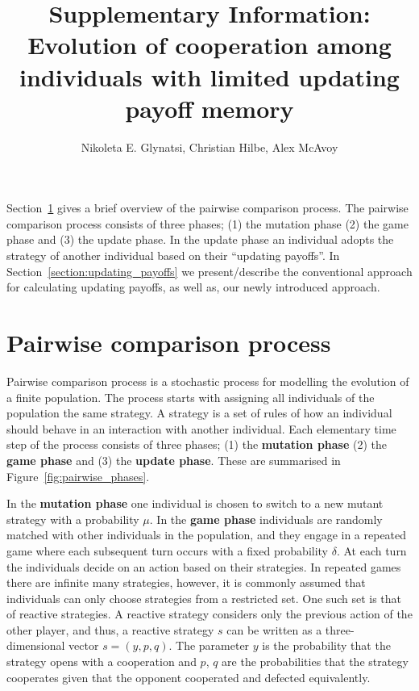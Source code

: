 \documentclass[11pt]{article}
\title{\bf  \sffamily \LARGE Supplementary Information: Evolution of cooperation among individuals with
limited updating payoff memory\\}
\date{}
\author{Nikoleta E. Glynatsi, Christian Hilbe, Alex McAvoy}
\theoremstyle{plainCl1}
\theoremstyle{plainCl2}
\begin{document}
\maketitle

Section~\ref{section:pairwise_comparison} gives a brief overview of the pairwise
comparison process. The pairwise comparison process consists of three phases;
(1) the mutation phase (2) the game phase and (3) the update phase. In the update
phase an individual adopts the strategy of another individual based on their
``updating payoffs''. In Section~\ref{section:updating_payoffs} we
present/describe the conventional approach for calculating updating payoffs, as
well as, our newly introduced approach.

\section{Pairwise comparison process}\label{section:pairwise_comparison}

Pairwise comparison process is a stochastic process for modelling the evolution
of a finite population. The process starts with assigning all individuals of the
population the same strategy. A strategy is a set of rules of how an individual
should behave in an interaction with another individual. Each elementary time
step of the process consists of three phases; (1) the \textbf{mutation phase}
(2) the \textbf{game phase} and (3) the \textbf{update phase}. These are summarised
in Figure~\ref{fig:pairwise_phases}.

In the \textbf{mutation phase} one individual is
chosen to switch to a new mutant strategy with a probability \(\mu\).
In the \textbf{game phase} individuals are randomly matched with other
individuals in the population, and they engage in a repeated game where each
subsequent turn occurs with a fixed probability \(\delta\). At each turn the
individuals decide on an action based on their strategies.
In repeated games there are infinite many strategies, however, it is commonly
assumed that individuals can only choose strategies from a restricted set. One
such set is that of reactive strategies. A reactive
strategy considers only the previous action of the other player, and thus, a
reactive strategy \(s\) can be written as a three-dimensional vector \(s=(y, p,
q)\). The parameter \(y\) is the probability that the strategy opens with a
cooperation and \(p\), \(q\) are the probabilities that the strategy cooperates
given that the opponent cooperated and defected equivalently.
\end{document}
